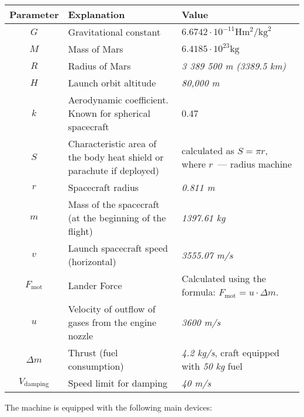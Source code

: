 \documentclass[12pt,a4paper]{article}
\begin{document}
\begin{center}
\begin{tabular}{ |c|p{6.5cm}|p{6cm}| }
  \hline
  \textbf{Parameter} & \textbf{Explanation} & \textbf{Value} \\
  \hline
  $ G $ & Gravitational constant & $ 6.6742 \cdot 10^{-11} \text{H} \text{m}^{2}/\text{kg}^{2} $ \\
   \hline
   $ M $ & Mass of Mars & $6.4185 \cdot 10^{23} \text{kg}$ \\
   \hline
   $ R $ & Radius of Mars & \emph{3 389 500 m (3389.5 km)} \\
   \hline
   $ H $ & Launch orbit altitude & \emph{80,000 m} \\
   \hline
   $ k $ & Aerodynamic coefficient. Known for spherical spacecraft & 0.47 \\
   \hline
   $ S $ & Characteristic area of the body
   heat shield or parachute if deployed) & calculated as $ S = \pi r $, where $r$~--- radius
   machine \\
   \hline
   $ r $ & Spacecraft radius & \emph{0.811 m} \\
   \hline
   $ m $ & Mass of the spacecraft (at the beginning of the flight) & \emph{1397.61 kg} \\
   \hline
   $ v $ & Launch spacecraft speed (horizontal) & \emph{3555.07 m/s} \\
   \hline
   $ F_{\text{mot}} $ & Lander Force &
   Calculated using the formula: $ F_{\text{mot}} = u \cdot \Delta m$.\\
   \hline
   $ u $ & Velocity of outflow of gases from the engine nozzle & \emph{3600 m/s}\\
   \hline
   $ \Delta m $ & Thrust (fuel consumption) & \emph{4.2 kg/s}, craft equipped with \emph{50 kg}
   fuel\\
   \hline
   $ V_{\text{damping}}$ & Speed limit for damping & \emph{40 m/s} \\
   \hline
\end{tabular}
\end{center}

The machine is equipped with the following main devices:
\end{document}
